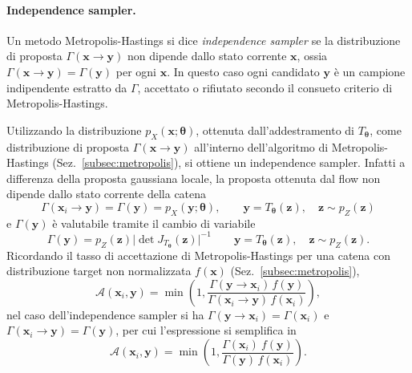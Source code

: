 \paragraph*{Independence sampler.}
Un metodo Metropolis-Hastings si dice \emph{independence sampler} se la distribuzione di proposta $\Gamma(\mathbf{x} \to \mathbf{y})$ non dipende dallo stato corrente $\mathbf{x}$, ossia $\Gamma(\mathbf{x} \to \mathbf{y}) = \Gamma(\mathbf{y})$ per ogni $\mathbf{x}$. In questo caso ogni candidato $\mathbf{y}$ è un campione indipendente estratto da $\Gamma$, accettato o rifiutato secondo il consueto criterio di Metropolis-Hastings.

Utilizzando la distribuzione $p_X(\mathbf{x}; \boldsymbol{\theta})$, ottenuta dall'addestramento di $T_{\boldsymbol{\theta}}$, come distribuzione di proposta $\Gamma(\mathbf{x} \to \mathbf{y})$ all'interno dell'algoritmo di Metropolis-Hastings (Sez.~\ref{subsec:metropolis}), si ottiene un independence sampler. Infatti a differenza della proposta gaussiana locale, la proposta ottenuta dal flow non dipende dallo stato corrente della catena
\begin{equation}
    \Gamma(\mathbf{x}_i \to \mathbf{y}) = \Gamma(\mathbf{y}) = p_X(\mathbf{y}; \boldsymbol{\theta}), \qquad \mathbf{y} = T_{\boldsymbol{\theta}}(\mathbf{z}), \quad \mathbf{z} \sim p_Z(\mathbf{z})
\end{equation}
e $\Gamma(\mathbf{y})$ è valutabile tramite il cambio di variabile
\begin{equation}
    \Gamma(\mathbf{y}) = p_Z(\mathbf{z}) \big|\det J_{T_{\boldsymbol{\theta}}}(\mathbf{z})\big|^{-1} \qquad \mathbf{y} = T_{\boldsymbol{\theta}}(\mathbf{z}), \quad \mathbf{z} \sim p_Z(\mathbf{z}). 
\end{equation}
Ricordando il tasso di accettazione di Metropolis-Hastings per una catena con distribuzione target non normalizzata $f(\mathbf{x})$ (Sez.~\ref{subsec:metropolis}),
\begin{equation}
    \mathcal{A}(\mathbf{x}_i, \mathbf{y}) = \min\left(1, \frac{\Gamma(\mathbf{y} \to \mathbf{x}_i)\, f(\mathbf{y})}{\Gamma(\mathbf{x}_i \to \mathbf{y})\, f(\mathbf{x}_i)}\right),
\end{equation}
nel caso dell'independence sampler si ha $\Gamma(\mathbf{y} \to \mathbf{x}_i) = \Gamma(\mathbf{x}_i)$ e $\Gamma(\mathbf{x}_i \to \mathbf{y}) = \Gamma(\mathbf{y})$, per cui l'espressione si semplifica in
\begin{equation}
    \mathcal{A}(\mathbf{x}_i, \mathbf{y}) = \min\left(1, \frac{\Gamma(\mathbf{x}_i) \ f(\mathbf{y})}{\Gamma(\mathbf{y})\, f(\mathbf{x}_i)}\right).
    \label{eq:flow-mcmc-accept}
\end{equation}


